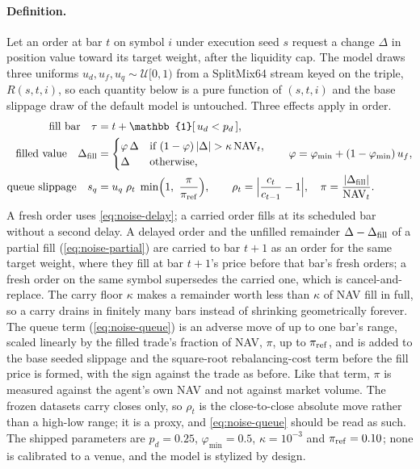 \paragraph{Definition.} Let an order at bar $t$ on symbol $i$ under execution seed $s$ request a change $\Delta$ in position value toward its target weight, after the liquidity cap. The model draws three uniforms $u_d, u_f, u_q \sim \mathcal{U}[0,1)$ from a SplitMix64 stream keyed on the triple, $R(s, t, i)$, so each quantity below is a pure function of $(s, t, i)$ and the base slippage draw of the default model is untouched. Three effects apply in order.
\begin{align}
\text{fill bar}\quad \tau &= t + \mathbb{1}[\,u_d < p_d\,],\label{eq:noise-delay}\\
\text{filled value}\quad \Delta_{\rm fill} &= \begin{cases}\varphi\,\Delta & \text{if } (1-\varphi)\,|\Delta| > \kappa\,\mathrm{NAV}_t,\\ \Delta & \text{otherwise,}\end{cases}\qquad \varphi = \varphi_{\min} + (1-\varphi_{\min})\,u_f,\label{eq:noise-partial}\\
\text{queue slippage}\quad s_q &= u_q\;\rho_t\;\min\!\Big(1,\ \frac{\pi}{\pi_{\rm ref}}\Big),\qquad \rho_t = \Big|\frac{c_t}{c_{t-1}} - 1\Big|,\quad \pi = \frac{|\Delta_{\rm fill}|}{\mathrm{NAV}_t}.\label{eq:noise-queue}
\end{align}
A fresh order uses \cref{eq:noise-delay}; a carried order fills at its scheduled bar without a second delay. A delayed order and the unfilled remainder $\Delta - \Delta_{\rm fill}$ of a partial fill (\cref{eq:noise-partial}) are carried to bar $t+1$ as an order for the same target weight, where they fill at bar $t+1$'s price before that bar's fresh orders; a fresh order on the same symbol supersedes the carried one, which is cancel-and-replace. The carry floor $\kappa$ makes a remainder worth less than $\kappa$ of NAV fill in full, so a carry drains in finitely many bars instead of shrinking geometrically forever. The queue term (\cref{eq:noise-queue}) is an adverse move of up to one bar's range, scaled linearly by the filled trade's fraction of NAV, $\pi$, up to $\pi_{\rm ref}$, and is added to the base seeded slippage and the square-root rebalancing-cost term before the fill price is formed, with the sign against the trade as before. Like that term, $\pi$ is measured against the agent's own NAV and not against market volume. The frozen datasets carry closes only, so $\rho_t$ is the close-to-close absolute move rather than a high-low range; it is a proxy, and \cref{eq:noise-queue} should be read as such. The shipped parameters are $p_d = 0.25$, $\varphi_{\min} = 0.5$, $\kappa = 10^{-3}$ and $\pi_{\rm ref} = 0.10$; none is calibrated to a venue, and the model is stylized by design.

